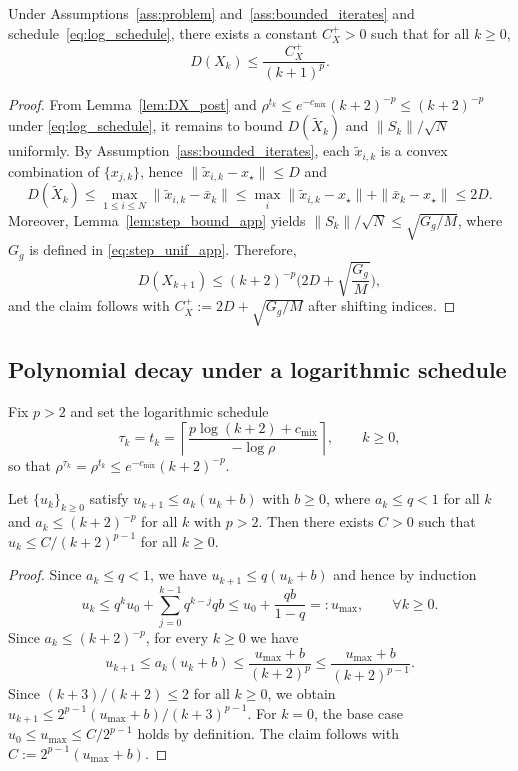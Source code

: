 \documentclass[review,onefignum,onetabnum]{siamart171218}
\begin{document}
	\begin{lemma}\label{lem:DX_post_decay}
		Under Assumptions~\ref{ass:problem} and~\ref{ass:bounded_iterates}
		and schedule~\eqref{eq:log_schedule}, there exists a constant $C_X^{+}>0$ such that for all $k\ge 0$,
		\[
		D(X_k)\le \frac{C_X^{+}}{(k+1)^{p}}.
		\]
	\end{lemma}
	\begin{proof}
		From Lemma~\ref{lem:DX_post} and
		$\rho^{t_k}\le e^{-c_{\mathrm{mix}}}(k+2)^{-p}\le (k+2)^{-p}$
		under \eqref{eq:log_schedule}, it remains to bound
		$D(\tilde X_k)$ and $\|S_k\|/\sqrt N$ uniformly.
		By Assumption~\ref{ass:bounded_iterates}, each $\tilde x_{i,k}$ is a convex combination of $\{x_{j,k}\}$, hence $\|\tilde x_{i,k}-x_\star\|\le D$ and
		\[
		D(\tilde X_k)\le \max_{1\le i\le N}\|\tilde x_{i,k}-\bar x_k\|
		\le \max_i \|\tilde x_{i,k}-x_\star\|+\|\bar x_k-x_\star\|\le 2D.
		\]
		Moreover, Lemma~\ref{lem:step_bound_app} yields $\|S_k\|/\sqrt N\le \sqrt{G_g/M}$, where $G_g$ is defined in \eqref{eq:step_unif_app}.
		Therefore,
		\[
		D(X_{k+1})\le (k+2)^{-p}\Big(2D+\sqrt{\frac{G_g}{M}}\Big),
		\]
		and the claim follows with $C_X^{+}:=2D+\sqrt{G_g/M}$ after shifting indices.
	\end{proof}
	
	\subsection{Polynomial decay under a logarithmic schedule}
	
	Fix $p>2$ and set the logarithmic schedule
	\begin{equation}\label{eq:log_schedule}
		\tau_k=t_k=
		\left\lceil \frac{p\log(k+2)+c_{\mathrm{mix}}}{-\log\rho}\right\rceil,\qquad k\ge 0,
	\end{equation}
	so that $\rho^{\tau_k}=\rho^{t_k}\le e^{-c_{\mathrm{mix}}}(k+2)^{-p}$.
	
	\begin{lemma}\label{lem:compare}
		Let $\{u_k\}_{k\ge0}$ satisfy $u_{k+1}\le a_k(u_k+b)$ with $b\ge0$, where
		$a_k\le q<1$ for all $k$ and $a_k\le (k+2)^{-p}$ for all $k$ with $p>2$.
		Then there exists $C>0$ such that $u_k\le C/(k+2)^{p-1}$ for all $k\ge0$.
	\end{lemma}
	\begin{proof}
		Since $a_k\le q<1$, we have $u_{k+1}\le q(u_k+b)$ and hence by induction
		\[
		u_k\le q^k u_0+\sum_{j=0}^{k-1} q^{k-j}qb \le u_0+\frac{qb}{1-q}=:u_{\max},\qquad \forall k\ge 0.
		\]
		Since $a_k\le (k+2)^{-p}$, for every $k\ge 0$ we have
		\[
		u_{k+1}\le a_k(u_k+b)\le \frac{u_{\max}+b}{(k+2)^{p}}\le \frac{u_{\max}+b}{(k+2)^{p-1}}.
		\]
		Since $(k+3)/(k+2)\le 2$ for all $k\ge 0$, we obtain
		$u_{k+1}\le 2^{p-1}(u_{\max}+b)/(k+3)^{p-1}$.
		For $k=0$, the base case $u_0\le u_{\max}\le C/2^{p-1}$ holds by definition.
		The claim follows with $C:=2^{p-1}(u_{\max}+b)$.
	\end{proof}
	
\end{document}
